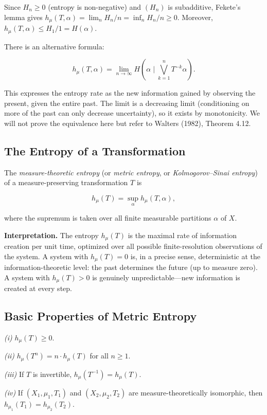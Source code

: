 Since $H_n \geq 0$ (entropy is non-negative) and $(H_n)$ is subadditive, Fekete's lemma gives $h_\mu(T, \alpha) = \lim_{n} H_n/n = \inf_n H_n/n \geq 0$. Moreover, $h_\mu(T, \alpha) \leq H_1/1 = H(\alpha)$.

\begin{remark}
There is an alternative formula:

\[
h_\mu(T, \alpha) = \lim_{n \to \infty} H\!\left(\alpha \;\Big|\; \bigvee_{k=1}^{n} T^{-k}\alpha\right).
\]

This expresses the entropy rate as the new information gained by observing the present, given the entire past. The limit is a decreasing limit (conditioning on more of the past can only decrease uncertainty), so it exists by monotonicity. We will not prove the equivalence here but refer to Walters (1982), Theorem 4.12.
\end{remark}


\subsection{The Entropy of a Transformation}\label{sec:11.4.3}

\begin{definition}\label{def:11.15}
The \textit{measure-theoretic entropy} (or \textit{metric entropy}, or \textit{Kolmogorov--Sinai entropy}) of a measure-preserving transformation $T$ is

\[
h_\mu(T) = \sup_\alpha h_\mu(T, \alpha),
\]

where the supremum is taken over all finite measurable partitions $\alpha$ of $X$.

\textbf{Interpretation.} The entropy $h_\mu(T)$ is the maximal rate of information creation per unit time, optimized over all possible finite-resolution observations of the system. A system with $h_\mu(T) = 0$ is, in a precise sense, deterministic at the information-theoretic level: the past determines the future (up to measure zero). A system with $h_\mu(T) > 0$ is genuinely unpredictable---new information is created at every step.
\end{definition}


\subsection{Basic Properties of Metric Entropy}\label{sec:11.4.4}

\begin{proposition}\label{prop:11.16.}

\textit{(i)} $h_\mu(T) \geq 0$.

\textit{(ii)} $h_\mu(T^n) = n \cdot h_\mu(T)$ for all $n \geq 1$.

\textit{(iii)} If $T$ is invertible, $h_\mu(T^{-1}) = h_\mu(T)$.

\textit{(iv)} If $(X_1, \mu_1, T_1)$ and $(X_2, \mu_2, T_2)$ are measure-theoretically isomorphic, then $h_{\mu_1}(T_1) = h_{\mu_2}(T_2)$.
\end{proposition}



